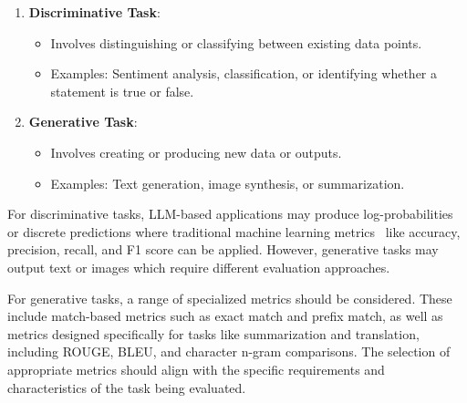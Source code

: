 \begin{enumerate}
    \item \textbf{Discriminative Task}:
    \begin{itemize}
        \item Involves distinguishing or classifying between existing data points.
        \item Examples: Sentiment analysis, classification, or identifying whether a statement is true or false.
    \end{itemize}
    
    \item \textbf{Generative Task}:
    \begin{itemize}
        \item Involves creating or producing new data or outputs.
        \item Examples: Text generation, image synthesis, or summarization.
    \end{itemize}
\end{enumerate}
For discriminative tasks, LLM-based applications may produce log-probabilities or discrete predictions where traditional machine learning metrics~ like accuracy, precision, recall, and F1 score can be applied. However, generative tasks may output text or images which require different evaluation approaches.

For generative tasks, a range of specialized metrics should be considered. These include match-based metrics such as exact match and prefix match, as well as metrics designed specifically for tasks like summarization and translation, including ROUGE, BLEU, and character n-gram comparisons. The selection of appropriate metrics should align with the specific requirements and characteristics of the task being evaluated.

